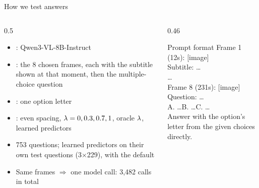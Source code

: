 \documentclass[aspectratio=169,11pt]{beamer}
\begin{document}
\begin{frame}{How we test answers}
  \begin{columns}[T,onlytextwidth]
    \begin{column}{0.5\textwidth}
      \small
      \begin{itemize}
        \item {}: Qwen3-VL-8B-Instruct
        \item {}: the 8 chosen frames, each with the subtitle shown at that moment, then the multiple-choice question
        \item {}: one option letter
        \item {}: even spacing, $\lambda=0, 0.3, 0.7, 1$, oracle $\lambda$, learned predictors
        \item 753 questions; learned predictors on their own test questions (3$\times$229),  with the default
        \item Same frames $\Rightarrow$ one model call: 3,482 calls in total
      \end{itemize}
    \end{column}
    \begin{column}{0.46\textwidth}
      \begin{exampleblock}{Prompt format}
        \scriptsize\ttfamily
        Frame 1 (12s): [image]\\
        Subtitle: \ldots\\
        \ldots\\
        Frame 8 (231s): [image]\\
        Question: \ldots\\
        A. \ldots\quad B. \ldots\quad C. \ldots\\
        Answer with the option's letter from the given choices directly.
      \end{exampleblock}
    \end{column}
  \end{columns}
\end{frame}
\end{document}

